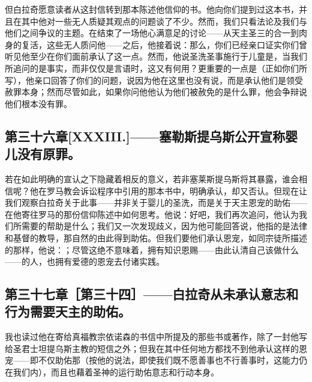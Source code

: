 但白拉奇愿意读者从这封信转到那本陈述他信仰的书。他向你们提到过这本书，并且在其中他对一些无人质疑其观点的问题谈了不少。然而，我们只看法论及我们与他们之间争议的主题。在结束了一场他心满意足的讨论——从天主圣三的合一到肉身的复活，这些无人质问他——之后，他接着说：那么，你们已经亲口证实你们曾听见他至少在你们面前承认了这一点。然而，他说圣洗圣事施行于儿童是，当我们所追问的是事实，而非仅仅是言语时，这又有何用？更重要的一点是（正如你们所写），他亲口回答了你们的问题，说因为他在这里也没有说，而是承认他们是领受赦罪本身；然而尽管如此，如果你问他他认为他们被赦免的是什么罪，他会争辩说他们根本没有罪。\par


\subsection{第三十六章[XXXIII.]——塞勒斯提乌斯公开宣称婴儿没有原罪。}

若在如此明确的宣认之下隐藏着相反的意义，若非塞莱斯提乌斯将其暴露，谁会相信呢？他在罗马教会诉讼程序中引用的那本书中，明确承认，却又否认。但现在让我们观察白拉奇关于此事——并非关于婴儿的圣洗，而是关于天主恩宠的助佑——在他寄往罗马的那份信仰陈述中如何思考。他说：好吧，我们再次追问，他认为我们所需要的帮助是什么；我们又一次发现歧义，因为他可能回答说，他指的是法律和基督的教导，那自然的由此得到助佑。但我们要他们承认恩宠，如同宗徒所描述的那样，他说：；尽管这绝不意味着，拥有知识恩赐——由此认清自己该做什么——的人，也拥有爱德的恩宠去付诸实践。\par


\subsection{第三十七章［第三十四］——白拉奇从未承认意志和行为需要天主的助佑。}

我也读过他在寄给真福教宗依诺森的书信中所提及的那些书或著作，除了一封他写给圣君士坦提乌斯主教的短信之外；但我在其中任何地方都找不到他承认这样的恩宠——即不仅助佑那（按他的说法，即使我们既不愿善事也不行善事时，这能力仍在我们内），而且也藉着圣神的运行助佑意志和行动本身。\par

